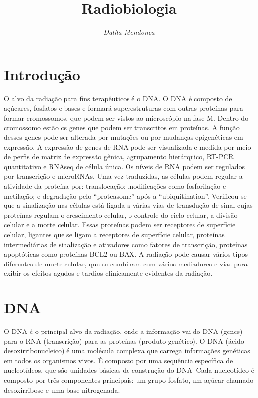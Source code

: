 \documentclass[11pt,a4paper]{article}
\title{\LobsterTwo\Huge{Radiobiologia}}
\author{\LobsterTwo{Biologia Molecular\nocite{*}}}
\date{\LobsterTwo\textit{Dalila Mendonça}}
\begin{document}
	\maketitle

	\section{Introdução}

		O alvo da radiação para fins terapêuticos é o DNA. O DNA é composto de açúcares, fosfatos e bases e formará superestruturas com outras proteínas para formar cromossomos, que podem ser vistos ao microscópio na fase M. Dentro do cromossomo estão os genes que podem ser transcritos em proteínas. A função desses genes pode ser alterada por mutações ou por mudanças epigenéticas em expressão. A expressão de genes de RNA pode ser visualizada e medida por meio de perfis de matriz de expressão gênica, agrupamento hierárquico, RT-PCR quantitativo e RNAseq de célula única. Os níveis de RNA podem ser regulados por transcrição e microRNAs. Uma vez traduzidas, as células podem regular a atividade da proteína por: translocação; modificações como fosforilação e metilação; e degradação pelo ``proteasome'' após a ``ubiquitination''. Verificou-se que a sinalização nas células está ligada a várias vias de transdução de sinal cujas proteínas regulam o crescimento celular, o controle do ciclo celular, a divisão celular e a morte celular. Essas proteínas podem ser receptores de superfície celular, ligantes que se ligam a receptores de superfície celular, proteínas intermediárias de sinalização e ativadores como fatores de transcrição, proteínas apoptóticas como proteínas BCL2 ou BAX. A radiação pode causar vários tipos diferentes de morte celular, que se combinam com vários mediadores e vias para exibir os efeitos agudos e tardios clinicamente evidentes da radiação.
  
    \section{DNA}

	    O DNA é o principal alvo da radiação, onde a informação vai do DNA  (genes) para o RNA (transcrição) para as proteínas (produto genético). O DNA (ácido desoxirribonucleico) é uma molécula complexa que carrega informações genéticas em todos os organismos vivos. É composto por uma sequência específica de nucleotídeos, que são unidades básicas de construção do DNA. Cada nucleotídeo é composto por três componentes principais: um grupo fosfato, um açúcar chamado desoxirribose e uma base nitrogenada.
\end{document}
